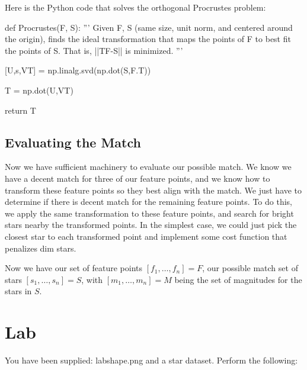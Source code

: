 \documentclass[paper=a4, fontsize=11pt]{scrartcl} %
\begin{document}
Here is the Python code that solves the orthogonal Procrustes problem:

\begin{python}
def Procrustes(F, S):
	'''
	Given F, S (same size, unit norm, and centered around the origin), finds the
	ideal transformation that maps the points of F to best fit the points of S.
	That is, ||TF-S|| is minimized.
	'''
	
	[U,s,VT] = np.linalg.svd(np.dot(S,F.T))
	
	T = np.dot(U,VT)
	
	return T
\end{python}

\subsection{Evaluating the Match}

Now we have sufficient machinery to evaluate our possible match.  We know we have a decent match for three of our feature points, and we know how to transform these feature points so they best align with the match. We just have to determine if there is decent match for the remaining feature points. To do this, we apply the same transformation to these feature points, and search for bright stars nearby the transformed points. In the simplest case, we could just pick the closest star to each transformed point and implement some cost function that penalizes dim stars.

Now we have our set of feature points $[f_1,\ldots,f_n]=F$, our possible match set of stars $[s_1,\ldots,s_n] = S$, with $[m_1,\ldots,m_n] = M$ being the set of magnitudes for the stars in $S$.




\section{Lab}
You have been supplied: labshape.png and a star dataset. Perform the following: 
\end{document}
